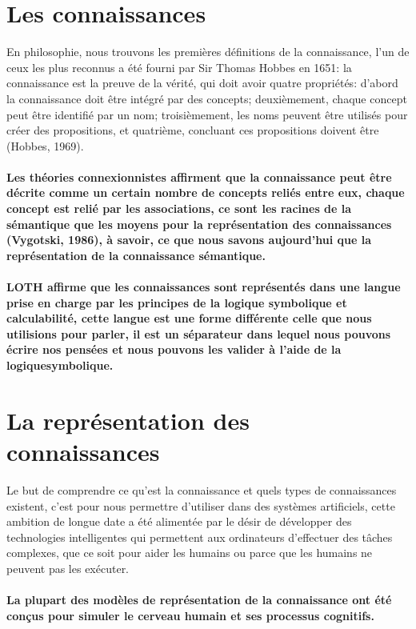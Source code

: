 \documentclass[12pt,a4paper]{report}
\begin{document}
\section{Les connaissances}
En philosophie, nous trouvons les premières définitions de la connaissance, l'un de ceux les plus reconnus a été fourni par Sir Thomas Hobbes en 1651: la connaissance est la preuve de la vérité, qui doit avoir quatre propriétés: d'abord la connaissance doit être intégré par des concepts; deuxièmement, chaque concept peut être identifié par un nom; troisièmement, les noms peuvent être utilisés pour créer des propositions, et quatrième, concluant ces propositions doivent être (Hobbes, 1969).\paragraph{\normalfont
Les théories connexionnistes affirment que la connaissance peut être décrite comme un certain nombre de concepts reliés entre eux, chaque concept est relié par les associations, ce sont les racines de la sémantique que les moyens pour la représentation des connaissances (Vygotski, 1986), à savoir, ce que nous savons aujourd'hui que la représentation de la connaissance sémantique.}\paragraph{\normalfont
LOTH affirme que les connaissances sont représentés dans une langue prise en charge par les principes de la logique symbolique et calculabilité, cette langue est une forme différente celle que nous utilisions pour parler, il est un séparateur dans lequel nous pouvons écrire nos pensées et nous pouvons les valider à l'aide de la logiquesymbolique.}
\section{La représentation des connaissances}
Le but de comprendre ce qu’est la connaissance et  quels types de connaissances existent, c’est pour nous permettre d'utiliser dans des systèmes artificiels, cette ambition de longue date a été alimentée par le désir de développer des technologies intelligentes qui permettent aux ordinateurs d'effectuer des tâches complexes, que ce soit pour aider les humains ou parce que les humains ne peuvent pas les exécuter.\paragraph{\normalfont
La plupart des modèles de représentation de la connaissance ont été conçus pour simuler le cerveau humain et ses processus cognitifs.}
\end{document}
